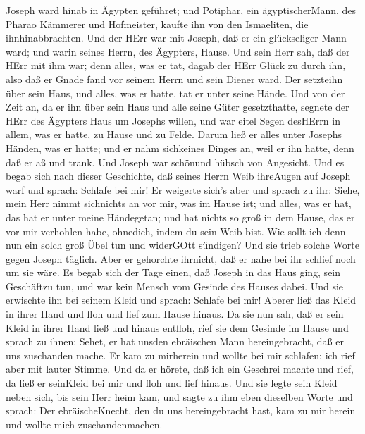  Joseph ward hinab in Ägypten geführet; und Potiphar, ein
ägyptischerMann, des Pharao Kämmerer und Hofmeister, kaufte ihn von den
Ismaeliten, die ihnhinabbrachten.  Und der HErr war mit
Joseph, daß er ein glückseliger Mann ward; und warin seines Herrn, des
Ägypters, Hause.  Und sein Herr sah, daß der HErr mit ihm
war; denn alles, was er tat, dagab der HErr Glück zu durch ihn,
 also daß er Gnade fand vor seinem Herrn und sein Diener
ward. Der setzteihn über sein Haus, und alles, was er hatte, tat er
unter seine Hände.  Und von der Zeit an, da er ihn über sein
Haus und alle seine Güter gesetzthatte, segnete der HErr des Ägypters
Haus um Josephs willen, und war eitel Segen desHErrn in allem, was er
hatte, zu Hause und zu Felde.  Darum ließ er alles unter
Josephs Händen, was er hatte; und er nahm sichkeines Dinges an, weil er
ihn hatte, denn daß er aß und trank. Und Joseph war schönund hübsch von
Angesicht.  Und es begab sich nach dieser Geschichte, daß
seines Herrn Weib ihreAugen auf Joseph warf und sprach: Schlafe bei mir!
 Er weigerte sich's aber und sprach zu ihr: Siehe, mein Herr
nimmt sichnichts an vor mir, was im Hause ist; und alles, was er hat,
das hat er unter meine Händegetan;  und hat nichts so groß
in dem Hause, das er vor mir verhohlen habe, ohnedich, indem du sein
Weib bist. Wie sollt ich denn nun ein solch groß Übel tun und widerGOtt
sündigen?  Und sie trieb solche Worte gegen Joseph täglich.
Aber er gehorchte ihrnicht, daß er nahe bei ihr schlief noch um sie
wäre.  Es begab sich der Tage einen, daß Joseph in das Haus
ging, sein Geschäftzu tun, und war kein Mensch vom Gesinde des Hauses
dabei.  Und sie erwischte ihn bei seinem Kleid und sprach:
Schlafe bei mir! Aberer ließ das Kleid in ihrer Hand und floh und lief
zum Hause hinaus.  Da sie nun sah, daß er sein Kleid in
ihrer Hand ließ und hinaus entfloh,  rief sie dem Gesinde
im Hause und sprach zu ihnen: Sehet, er hat unsden ebräischen Mann
hereingebracht, daß er uns zuschanden mache. Er kam zu mirherein und
wollte bei mir schlafen; ich rief aber mit lauter Stimme. 
Und da er hörete, daß ich ein Geschrei machte und rief, da ließ er
seinKleid bei mir und floh und lief hinaus.  Und sie legte
sein Kleid neben sich, bis sein Herr heim kam,  und sagte
zu ihm eben dieselben Worte und sprach: Der ebräischeKnecht, den du uns
hereingebracht hast, kam zu mir herein und wollte mich zuschandenmachen.

